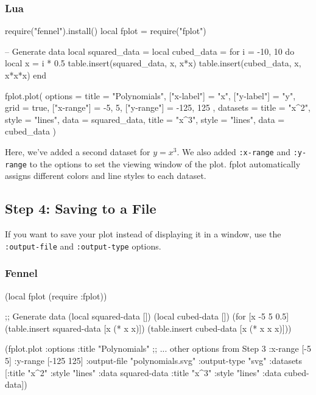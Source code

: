 \documentclass[12pt, letterpaper]{article}
\begin{document}
	\subsubsection*{Lua}
	
	\begin{luacode}
require("fennel").install()
local fplot = require("fplot")

-- Generate data
local squared_data = {}
local cubed_data = {}
for i = -10, 10 do
local x = i * 0.5
table.insert(squared_data, {x, x*x})
table.insert(cubed_data, {x, x*x*x})
end

fplot.plot({
	options = {
		title = "Polynomials",
		["x-label"] = "x",
		["y-label"] = "y",
		grid = true,
		["x-range"] = {-5, 5},
		["y-range"] = {-125, 125}
	},
	datasets = {
		{title = "x^2", style = "lines", data = squared_data},
		{title = "x^3", style = "lines", data = cubed_data}
	}
})
	\end{luacode}
	
	Here, we've added a second dataset for $y = x^3$. We also added \texttt{:x-range} and \texttt{:y-range} to the options to set the viewing window of the plot. fplot automatically assigns different colors and line styles to each dataset.
	
	\subsection{Step 4: Saving to a File}
	
	If you want to save your plot instead of displaying it in a window, use the \texttt{:output-file} and \texttt{:output-type} options.
	
	\subsubsection*{Fennel}
	
	\begin{fennelcode}
(local fplot (require :fplot))

;; Generate data
(local squared-data [])
(local cubed-data [])
(for [x -5 5 0.5]
(table.insert squared-data [x (* x x)])
(table.insert cubed-data [x (* x x x)]))

(fplot.plot
{:options {:title "Polynomials"
		;; ... other options from Step 3
		:x-range [-5 5]
		:y-range [-125 125]
		:output-file "polynomials.svg"
		:output-type "svg"}
	:datasets [{:title "x^2" :style "lines" :data squared-data}
	{:title "x^3" :style "lines" :data cubed-data}]})
	\end{fennelcode}
	
\end{document}
